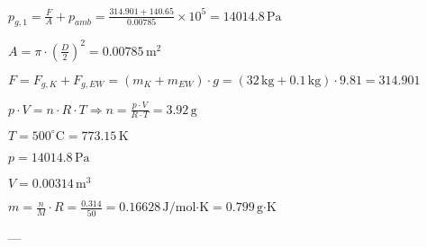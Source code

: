 \( p_{g,1} = \frac{F}{A} + p_{amb} = \frac{314.901 + 140.65}{0.00785} \times 10^5 = 14014.8 \, \text{Pa} \)  

\( A = \pi \cdot \left(\frac{D}{2}\right)^2 = 0.00785 \, \text{m}^2 \)  

\( F = F_{g,K} + F_{g,EW} = (m_K + m_{EW}) \cdot g = (32 \, \text{kg} + 0.1 \, \text{kg}) \cdot 9.81 = 314.901 \)  

\( p \cdot V = n \cdot R \cdot T \Rightarrow n = \frac{p \cdot V}{R \cdot T} = 3.92 \, \text{g} \)  

\( T = 500^\circ \text{C} = 773.15 \, \text{K} \)  

\( p = 14014.8 \, \text{Pa} \)  

\( V = 0.00314 \, \text{m}^3 \)  

\( m = \frac{n}{M} \cdot R = \frac{0.314}{50} = 0.16628 \, \text{J/mol·K} = 0.799 \, \text{g·K} \)  

---